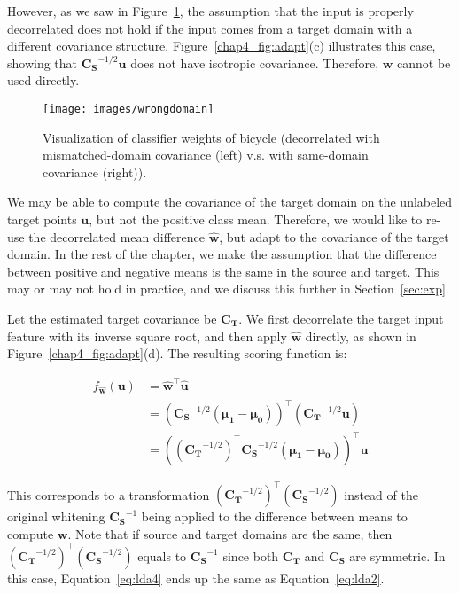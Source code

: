 \documentclass[graybox]{svmult}
\newcommand{\xTar}{\vec{u}}
\newcommand{\wSrc}{\vec{w}}
\newcommand\mat[1]{\mathbf{#1}}
\renewcommand\vec[1]{\mathbf{#1}}
\newcommand{\muPosSrc}{\mathbf{\mu_{1}}}
\newcommand{\muNegSrc}{\vec{\mu_{0}}}
\newcommand{\sigSrc}{\mat{C_S}}
\newcommand{\sigTar}{\mat{C_T}}
\begin{document}
However, as we saw in Figure~\ref{chap4_fig:wrongdomain}, the assumption that the input is properly decorrelated does not hold if the input comes from a target domain with a different covariance structure. Figure~\ref{chap4_fig:adapt}(c) illustrates this case, showing that ${\sigSrc}^{-1/2} \xTar$ does not have isotropic covariance. Therefore, $\wSrc$ cannot be used directly. 

\begin{figure}
\centering
\texttt{[image: images/wrongdomain]}
\caption{\small Visualization of classifier weights of bicycle (decorrelated with mismatched-domain covariance (left) v.s. with same-domain covariance (right)).}
\label{chap4_fig:wrongdomain}
\end{figure}

We may be able to compute the covariance of the target domain on the unlabeled target points $\xTar$, but not the positive class mean. Therefore, we would like to re-use the decorrelated mean difference $\hat{\wSrc}$, but adapt to the covariance of the target domain.
In the rest of the chapter, we make the assumption that the difference between positive and negative means is the same in the source and target. This may or may not hold in practice, and we discuss this further in Section~\ref{sec:exp}.

Let the estimated target covariance be $\sigTar$. We first decorrelate the target input feature with its inverse square root, and then apply $\hat{\wSrc}$ directly, as shown in Figure~\ref{chap4_fig:adapt}(d). The resulting scoring function is:

      \begin{equation}
      \begin{aligned}
         f_{\hat{\wSrc}}(\xTar) &= \hat{\wSrc}^{\top} \hat{\xTar}  \\
			  &= {({\sigSrc}^{-1/2} (\muPosSrc-\muNegSrc))}^{\top} ({\sigTar}^{-1/2} \xTar) \\
			 &= {(({\sigTar}^{-1/2})^{\top}{\sigSrc}^{-1/2} (\muPosSrc-\muNegSrc))}^{\top}\xTar
	  \end{aligned}
	  \label{eq:lda4}
      \end{equation}
      
This corresponds to a transformation 
$({\sigTar}^{-1/2})^{\top} ({\sigSrc}^{-1/2})$
instead of the original whitening ${\sigSrc}^{-1}$  being applied to the difference between means to compute $\wSrc$. Note that if source and target domains are the same, then 
$({\sigTar}^{-1/2})^{\top} ({\sigSrc}^{-1/2})$ 
equals to ${\sigSrc}^{-1}$ since both ${\sigTar}$ and $\sigSrc$ are symmetric. In this case, Equation~\ref{eq:lda4} ends up the same as Equation~\ref{eq:lda2}.
\end{document}
